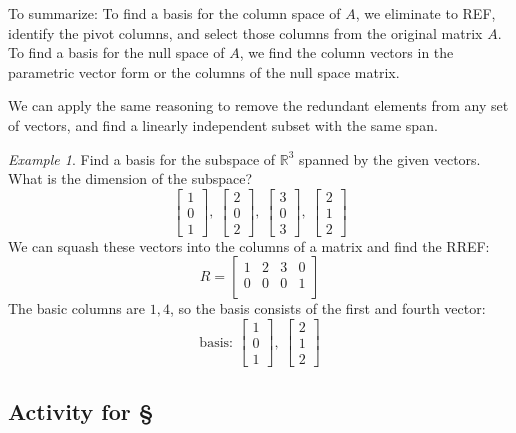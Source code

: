 \documentclass[11pt,oneside]{amsbook}
\newcommand{\R}{\mathbb R}
\theoremstyle{definition}
\theoremstyle{plain}
\theoremstyle{definition}
\theoremstyle{remark}
\newtheorem{example}[theorem]{Example}
\numberwithin{equation}{section}
\numberwithin{figure}{section}
\begin{document}
To summarize: To find a basis for the column space of $A$, we eliminate to REF, identify the pivot columns, and select those columns from the original matrix $A$. To find a basis for the null space of $A$, we find the column vectors in the  parametric vector form or the columns of the null space matrix.

We can apply the same reasoning to remove the redundant elements from any set of vectors, and find a linearly independent subset with the same span.

\begin{example}
  Find a basis for the subspace of $\R^3$ spanned by the given vectors. What is the dimension of the subspace?
  \[\begin{bmatrix}1\\0\\1\end{bmatrix},\ 
    \begin{bmatrix}2\\0\\2\end{bmatrix},\ 
    \begin{bmatrix}3\\0\\3\end{bmatrix},\ 
    \begin{bmatrix}2\\1\\2\end{bmatrix}
  \]
  We can squash these vectors into the columns of a matrix and find the RREF:
  \[R=\begin{bmatrix}1&2&3&0\\0&0&0&1\\&&&\end{bmatrix}
  \]
  The basic columns are $1,4$, so the basis consists of the first and fourth vector:
  \[\text{basis: }\begin{bmatrix}1\\0\\1\end{bmatrix},\ 
  \begin{bmatrix}2\\1\\2\end{bmatrix}
  \]
\end{example}

\newpage
\subsection*{Activity for \S \thesection}
\end{document}
